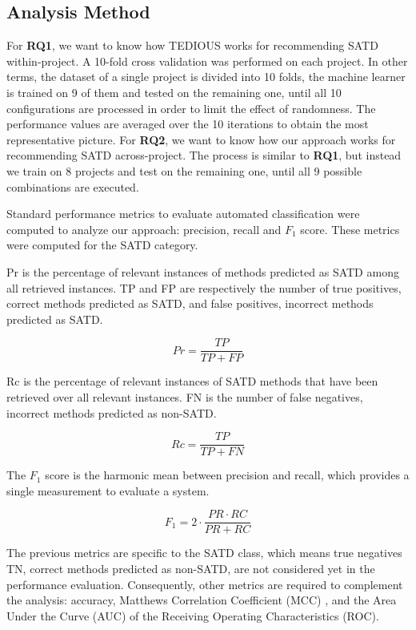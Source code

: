 \subsection{Analysis Method}


For \textbf{RQ1}, we want to know how \ac{TEDIOUS} works for recommending \ac{SATD} within-project. A 10-fold cross validation was performed on each project. In other terms, the dataset of a single project is divided into 10 folds, the machine learner is trained on 9 of them and tested on the remaining one, until all 10 configurations are processed in order to limit the effect of randomness. The performance values are averaged over the 10 iterations to obtain the most representative picture. For \textbf{RQ2}, we want to know how our approach works for recommending \ac{SATD} across-project. The process is similar to \textbf{RQ1}, but instead we train on 8 projects and test on the remaining one, until all 9 possible combinations are executed. \par 

Standard performance metrics to evaluate automated classification were computed to analyze our approach: precision, recall and $F_{1}$ score. These metrics were computed for the \ac{SATD} category. \par 

\ac{Pr} is the percentage of relevant instances of methods predicted as \ac{SATD} among all retrieved instances. \ac{TP} and \ac{FP} are respectively the number of true positives, correct methods predicted as \ac{SATD}, and false positives, incorrect methods predicted as \ac{SATD}.

\[
Pr=\frac{TP}{TP+FP}
\]

\ac{Rc} is the percentage of relevant instances of \ac{SATD} methods that have been retrieved over all relevant instances. \ac{FN} is the number of false negatives, incorrect methods predicted as non-\ac{SATD}.

\[
Rc=\frac{TP}{TP+FN}
\]

The $F_{1}$ score is the harmonic mean between precision and recall, which provides a single measurement to evaluate a system.

\[
F_1=2 \cdot \frac{PR \cdot RC}{PR + RC}
\]

The previous metrics are specific to the \ac{SATD} class, which means true negatives \ac{TN}, correct methods predicted as non-\ac{SATD}, are not considered yet in the performance evaluation. Consequently, other metrics are required to complement the analysis: accuracy, Matthews Correlation Coefficient (MCC) \citep{matthews1975comparison}, and the Area Under the Curve (AUC) of the Receiving Operating Characteristics (ROC). \par 


